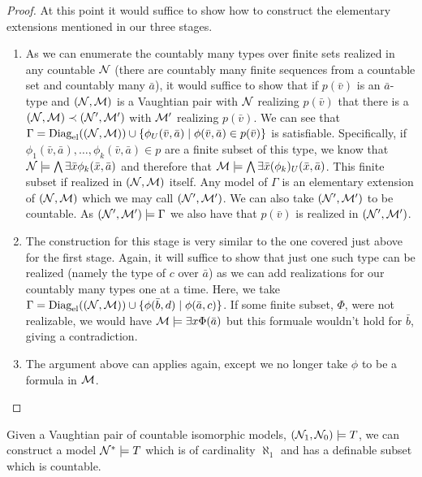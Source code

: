 \begin{proof}
At this point it would suffice to show how to construct the elementary extensions mentioned in our three stages. 
\begin{enumerate}
\item As we can enumerate the countably many types over finite sets realized in any countable \(\mathcal{N}\) (there are countably many finite sequences from a countable set and countably many \(\bar{a}\)), it would suffice to show that if \(p(\bar{v})\) is an \(\bar{a}\)-type and \((\mathcal{N}, \mathcal{M})\) is a Vaughtian pair with \(\mathcal{N}\) realizing \(p(\bar{v})\) that there is a \((\mathcal{N}, \mathcal{M}) \prec (\mathcal{N}', \mathcal{M}')\) with \(\mathcal{M}'\) realizing \(p(\bar{v})\). 
We can see that \(\Gamma = \text{Diag}_\text{el}((\mathcal{N}, \mathcal{M})) \cup \{\phi_U(\bar{v}, \bar{a}) \mid \phi(\bar{v}, \bar{a}) \in  p(\bar{v})\}\) is satisfiable.  
Specifically, if \(\phi_1(\bar{v}, \bar{a}), \ldots, \phi_k(\bar{v}, \bar{a}) \in p\) are a finite subset of this type, we know that \(\mathcal{N} \models \bigwedge \exists \bar{x} \phi_k(\bar{x},\bar{a})\) and therefore that \(\mathcal{M} \models \bigwedge \exists \bar{x} (\phi_k)_U(\bar{x},\bar{a})\). 
This finite subset if realized in \((\mathcal{N}, \mathcal{M})\) itself. 
Any model of \(\Gamma\) is an elementary extension of \((\mathcal{N}, \mathcal{M})\) which we may call \((\mathcal{N}', \mathcal{M}')\).
We can also take \((\mathcal{N}', \mathcal{M}')\) to be countable. 
As \((\mathcal{N}', \mathcal{M}') \models \Gamma\) we also have that \(p(\bar{v})\) is realized in \((\mathcal{N}', \mathcal{M}')\). 
\item The construction for this stage is very similar to the one covered just above for the first stage.
Again, it will suffice to show that just one such type can be realized (namely the type of \(c\) over \(\bar{a}\)) as we can add realizations for our countably many types one at a time. 
Here, we take \(\Gamma = \text{Diag}_\text{el}((\mathcal{N}, \mathcal{M})) \cup \{\phi(\bar{b}, d) \mid \phi(\bar{a}, c)\}\). 
If some finite subset, \(\Phi\), were not realizable, we would have \(\mathcal{M} \models \exists x \Phi(\bar{a})\) but this formuale wouldn't hold for \(\bar{b}\), giving a contradiction. 
\item The argument above can applies again, except we no longer take \(\phi\) to be a formula in \(\mathcal{M}\). %
\end{enumerate}

\end{proof}

\begin{theorem}\label{theorem_aleph_one_vaightian_pairs}
Given a Vaughtian pair of countable isomorphic models, \((\mathcal{N}_1, \mathcal{N}_0) \models T\), we can construct a model \(\mathcal{N}^*\models T\) which is of cardinality \(\aleph_1\) and has a definable subset which is countable.  
\end{theorem}

